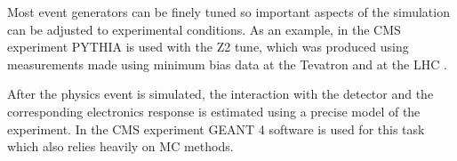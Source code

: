 Most event generators can be finely tuned so important aspects of the simulation can be adjusted to experimental conditions. As an example, in the \gls{CMS} experiment \textsc{PYTHIA} is used with the Z2 tune, which was produced using measurements made using minimum bias data at the Tevatron and at the \gls{LHC} \cite{ARTICLE:CMSMeasurementUnderlyingEventActivity}.  

After the physics event is simulated, the interaction with the detector and the corresponding electronics response is estimated using a precise model of the experiment. In the \gls{CMS} experiment \textsc{GEANT 4} \cite{ARTICLE:GEANT4ASimulationToolkit,ARTICLE:Geant4DevelopmentsAndApplications} software is used for this task which also relies heavily on \gls{MC} methods.




